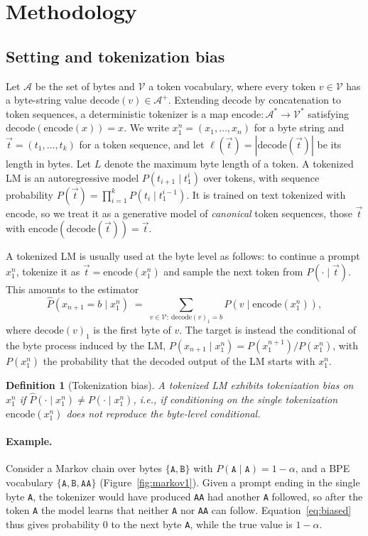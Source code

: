 \documentclass{article} %
\newtheorem{definition}{Definition}
\newcommand{\bytes}{\mathcal{A}}
\newcommand{\vocab}{\mathcal{V}}
\newcommand{\enc}{\mathrm{encode}}
\newcommand{\dec}{\mathrm{decode}}
\begin{document}
\section{Methodology}
\label{sec:method}
\subsection{Setting and tokenization bias}
\label{sec:setting}
Let $\bytes$ be the set of bytes and $\vocab$ a token vocabulary, where every token $v \in \vocab$ has a byte-string value $\dec(v) \in \bytes^{+}$. Extending $\dec$ by concatenation to token sequences, a deterministic tokenizer is a map $\enc : \bytes^{*} \to \vocab^{*}$ satisfying $\dec(\enc(x)) = x$. We write $x_1^n = (x_1, \dots, x_n)$ for a byte string and $\vec t = (t_1,\dots,t_k)$ for a token sequence, and let $\ell(\vec t) = |\dec(\vec t)|$ be its length in bytes. Let $L$ denote the maximum byte length of a token. A tokenized LM is an autoregressive model $P(t_{i+1} \mid t_1^i)$ over tokens, with sequence probability $P(\vec t) = \prod_{i=1}^{k} P(t_i \mid t_1^{i-1})$. It is trained on text tokenized with $\enc$, so we treat it as a generative model of \emph{canonical} token sequences, those $\vec t$ with $\enc(\dec(\vec t)) = \vec t$.

A tokenized LM is usually used at the byte level as follows: to continue a prompt $x_1^n$, tokenize it as $\vec t = \enc(x_1^n)$ and sample the next token from $P(\cdot \mid \vec t)$. This amounts to the estimator
\begin{equation}
\widehat P(x_{n+1} = b \mid x_1^n) \;=\; \sum_{v \in \vocab:\ \dec(v)_1 = b} P(v \mid \enc(x_1^n)),
\label{eq:biased}
\end{equation}
where $\dec(v)_1$ is the first byte of $v$. The target is instead the conditional of the byte process induced by the LM, $P(x_{n+1}\mid x_1^n) = P(x_1^{n+1}) / P(x_1^{n})$, with $P(x_1^n)$ the probability that the decoded output of the LM starts with $x_1^n$.

\begin{definition}[Tokenization bias]
A tokenized LM exhibits tokenization bias on $x_1^n$ if $\widehat P(\cdot \mid x_1^n) \neq P(\cdot \mid x_1^n)$, i.e., if conditioning on the single tokenization $\enc(x_1^n)$ does not reproduce the byte-level conditional.
\end{definition}

\paragraph{Example.}
Consider a Markov chain over bytes $\{\texttt{A},\texttt{B}\}$ with $P(\texttt{A}\mid\texttt{A}) = 1-\alpha$, and a BPE vocabulary $\{\texttt{A},\texttt{B},\texttt{AA}\}$ (Figure~\ref{fig:markov1}). Given a prompt ending in the single byte \texttt{A}, the tokenizer would have produced \texttt{AA} had another \texttt{A} followed, so after the token \texttt{A} the model learns that neither \texttt{A} nor \texttt{AA} can follow. Equation~\eqref{eq:biased} thus gives probability $0$ to the next byte \texttt{A}, while the true value is $1-\alpha$.
\end{document}
